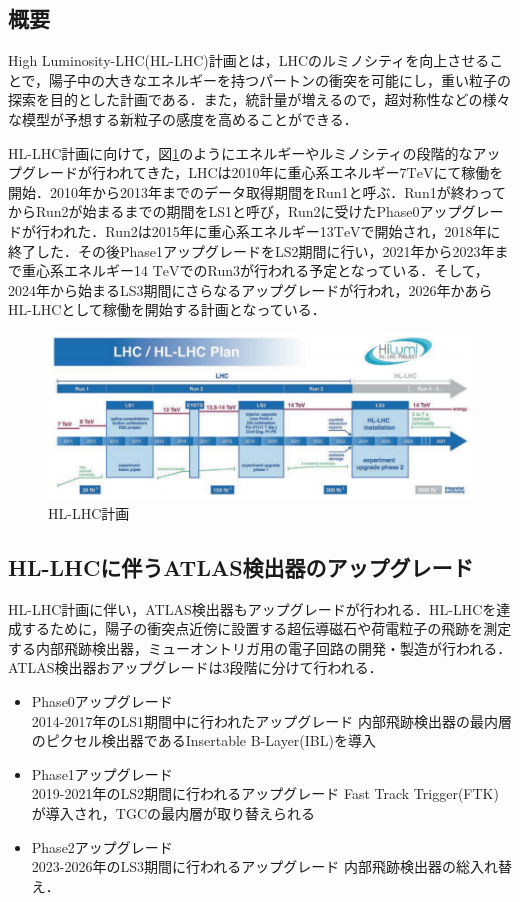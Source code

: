 \subsection{概要}
High Luminosity-LHC(HL-LHC)計画とは，LHCのルミノシティを向上させることで，陽子中の大きなエネルギーを持つパートンの衝突を可能にし，重い粒子の探索を目的とした計画である．また，統計量が増えるので，超対称性などの様々な模型が予想する新粒子の感度を高めることができる．\par
HL-LHC計画に向けて，図\ref{fig:HL-LHC}のようにエネルギーやルミノシティの段階的なアップグレードが行われてきた，LHCは2010年に重心系エネルギー7$\mathrm{TeV}$にて稼働を開始．2010年から2013年までのデータ取得期間をRun1と呼ぶ．Run1が終わってからRun2が始まるまでの期間をLS1と呼び，Run2に受けたPhase0アップグレードが行われた．Run2は2015年に重心系エネルギー13$\mathrm{TeV}$で開始され，2018年に終了した．その後Phase1アップグレードをLS2期間に行い，2021年から2023年まで重心系エネルギー14 $\mathrm{TeV}$でのRun3が行われる予定となっている．そして，2024年から始まるLS3期間にさらなるアップグレードが行われ，2026年かあらHL-LHCとして稼働を開始する計画となっている．

\begin{figure}[h]
  \centering
  \includegraphics[width=12cm]{./figure/HL_LHC.png}
  \caption{HL-LHC計画\cite{Apollinari:2284929}}
  \label{fig:HL-LHC}
\end{figure}


\subsection{HL-LHCに伴うATLAS検出器のアップグレード}
HL-LHC計画に伴い，ATLAS検出器もアップグレードが行われる．HL-LHCを達成するために，陽子の衝突点近傍に設置する超伝導磁石や荷電粒子の飛跡を測定する内部飛跡検出器，ミューオントリガ用の電子回路の開発・製造が行われる．ATLAS検出器おアップグレードは3段階に分けて行われる．

\begin{itemize}
\item Phase0アップグレード\\
2014-2017年のLS1期間中に行われたアップグレード
内部飛跡検出器の最内層のピクセル検出器であるInsertable B-Layer(IBL)を導入
\item Phase1アップグレード\\
2019-2021年のLS2期間に行われるアップグレード
Fast Track Trigger(FTK)が導入され，TGCの最内層が取り替えられる
\item Phase2アップグレード\\
2023-2026年のLS3期間に行われるアップグレード
内部飛跡検出器の総入れ替え．
\end{itemize}



